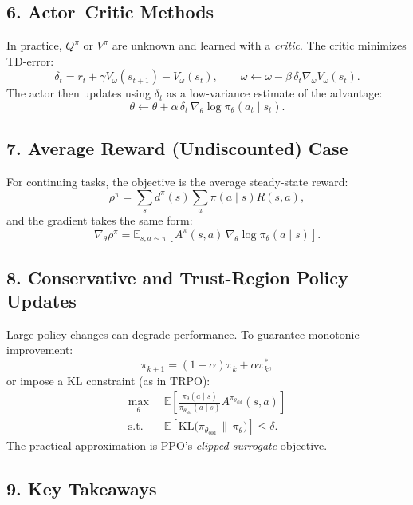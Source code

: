 \documentclass[12pt]{article}
\begin{document}
\subsection*{6. Actor--Critic Methods}

In practice, $Q^\pi$ or $V^\pi$ are unknown and learned with a \emph{critic}.
The critic minimizes TD-error:
\[
		\delta_t = r_t + \gamma V_\omega(s_{t+1}) - V_\omega(s_t),
		\qquad
		\omega \leftarrow \omega - \beta \, \delta_t \nabla_\omega V_\omega(s_t).
\]
The actor then updates using $\delta_t$ as a low-variance estimate of the advantage:
\[
		\theta \leftarrow \theta + \alpha \, \delta_t \, \nabla_\theta \log \pi_\theta(a_t\mid s_t).
\]

\subsection*{7. Average Reward (Undiscounted) Case}

For continuing tasks, the objective is the average steady-state reward:
\[
		\rho^\pi = \sum_s d^\pi(s) \sum_a \pi(a\mid s) R(s,a),
\]
and the gradient takes the same form:
\[
		\nabla_\theta \rho^\pi
		= \mathbb{E}_{s,a \sim \pi}\!\left[
				A^\pi(s,a)\,\nabla_\theta \log \pi_\theta(a\mid s)
		\right].
\]

\subsection*{8. Conservative and Trust-Region Policy Updates}

Large policy changes can degrade performance.
To guarantee monotonic improvement:
\[
		\pi_{k+1} = (1-\alpha)\pi_k + \alpha \pi^*_k,
\]
or impose a KL constraint (as in TRPO):
\begin{equation}
		\begin{aligned}
				\max_{\theta}\;\;&
				\mathbb{E}\!\left[
						\frac{\pi_\theta(a\mid s)}{\pi_{\theta_{\mathrm{old}}}(a\mid
						s)}A^{\pi_{\theta_{\mathrm{old}}}}(s,a)
				\right]\\
				\text{s.t.}\;\;&
				\mathbb{E}\!\left[\mathrm{KL}\bigl(\pi_{\theta_{\mathrm{old}}}\,\|\,\pi_\theta\bigr)\right]\le\delta.
		\end{aligned}
\end{equation}
The practical approximation is PPO’s \emph{clipped surrogate} objective.

\subsection*{9. Key Takeaways}
\end{document}
